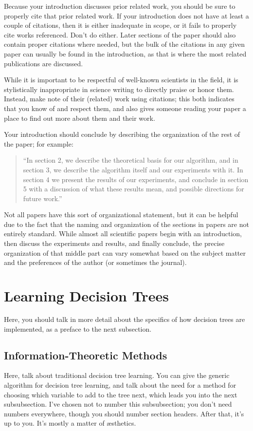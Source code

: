 \documentclass[12pt, letterpaper]{article}
\begin{document}
Because your introduction discusses prior related work, you should be sure to
properly cite that prior related work.  If your introduction does not have at
least a couple of citations, then it is either inadequate in scope, or it fails
to properly cite works referenced.  Don't do either.  Later sections of the
paper should also contain proper citations where needed, but the bulk of the
citations in any given paper can usually be found in the introduction, as that
is where the most related publications are discussed.

While it is important to be respectful of well-known scientists in the field, it
is stylistically inappropriate in science writing to directly praise or honor
them.  Instead, make note of their (related) work using citations; this both
indicates that you know of and respect them, and also gives someone reading your
paper a place to find out more about them and their work.

Your introduction should conclude by describing the organization of the rest of
the paper; for example:
\begin{quote}
``In section 2, we describe the theoretical basis for our algorithm, and in section
3, we describe the algorithm itself and our experiments with it.  In section 4
we present the results of our experiments, and conclude in section 5 with a
discussion of what these results mean, and possible directions for future
work.''
\end{quote}

Not all papers have this sort of organizational statement, but it can be helpful
due to the fact that the naming and organization of the sections in papers are
not entirely standard.  While almost all scientific papers begin with an
introduction, then discuss the experiments and results, and finally conclude,
the precise organization of that middle part can vary somewhat based on the
subject matter and the preferences of the author (or sometimes the journal).

\section{Learning Decision Trees}
Here, you should talk in more detail about the specifics of how decision trees
are implemented, as a preface to the next subsection.

\subsection{Information-Theoretic Methods}
Here, talk about traditional decision tree learning.  You can give the generic
algorithm for decision tree learning, and talk about the need for a method for
choosing which variable to add to the tree next, which leads you into the next
subsubsection.  I've chosen not to number this subsubsection; you don't need
numbers everywhere, though you should number section headers.  After that, it's
up to you.  It's mostly a matter of \ae sthetics.
\end{document}
